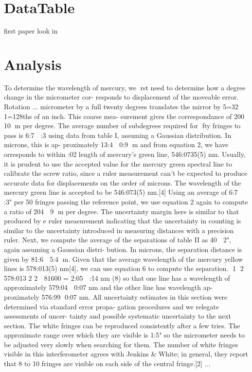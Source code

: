 \documentclass[12pt,twocolumn]{article}
\begin{document}
\section{DataTable}
	first paper look in
\section{Analysis}
To determine the wavelength of mercury, we rst need to determine how a degree change in the micrometer cor- responds to displacement of the moveable error. Rotation ...
micrometer by a full twenty degrees translates the
mirror by 5=32  1=128ths of an inch. This coarse mea-
surement gives the correspondance of 200  10 m per
degree. The average number of subdegrees required for
fty fringes to pass is 6:7  :3 using data from table I,
assuming a Gaussian distribution. In microns, this is ap-
proximately 13:4  0:9 m and from equation 2, we have
orresponds to within :02%
length of mercury's green line, 546:0735(5) nm.
Usually, it is prudent to use the accepted value for the
mercury green spectral line to calibrate the screw ratio,
since a ruler measurement can't be expected to produce
accurate data for displacements on the order of microns.
The wavelength of the mercury green line is accepted to
be 546:073(5) nm.[4] Using an average of 6:7  :3" per
50 fringes passing the reference point, we use equation 2
again to compute a ratio of 204  9 m per degree. The
uncertainty margin here is similar to that produced by
e ruler measurement indicating that the uncertainty
in counting is similar to the uncertainty introduced in
measuring distances with a precision ruler.
Next, we compute the average of the separations of
table II as 40  2", again assuming a Gaussian distri-
bution. In microns, the separation distance is given by
81:6  5:4 m. Given that the average wavelength of
the mercury yellow lines is 578:013(5) nm[4], we can use
equation 6 to compute the separation.
1  2 
578:013
2
2  81600
= 2:05  :14 nm (8)
so that one line has a wavelength of approximately
579:04  0:07 nm and the other line has wavelength ap-
proximately 576:99  0:07 nm. All uncertainty estimates
in this section were determined via standard error propa-
gation procedures and we relegate assessments of uncer-
tainty and possible systematic uncertainty to the next
section.
The white fringes can be reproduced consistently after
a few tries. The approximate range over which they are
visible is 1:5" so the micrometer needs to be adjusted
very slowly when searching for them. The number of
white fringes visible in this interferometer agrees with
Jenkins & White; in general, they report that 8 to 10
fringes are visible on each side of the central fringe.[2]
...
\end{document}
